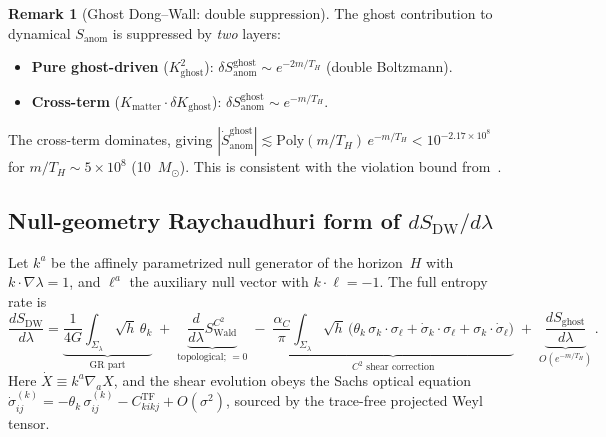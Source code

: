 \documentclass[11pt,a4paper]{article}
\theoremstyle{plain}
\theoremstyle{definition}
\newtheorem{remark}[theorem]{Remark}
\begin{document}
\begin{remark}[Ghost Dong--Wall: double suppression]
  The ghost contribution to dynamical $S_{\mathrm{anom}}$ is
  suppressed by \emph{two} layers:
  \begin{itemize}
    \item \textbf{Pure ghost-driven} ($K_{\mathrm{ghost}}^2$):
      $\delta S_{\mathrm{anom}}^{\mathrm{ghost}} \sim e^{-2m/T_H}$
      (double Boltzmann).
    \item \textbf{Cross-term}
      ($K_{\mathrm{matter}} \cdot \delta K_{\mathrm{ghost}}$):
      $\delta S_{\mathrm{anom}}^{\mathrm{ghost}} \sim e^{-m/T_H}$.
  \end{itemize}
  The cross-term dominates, giving
  $|\dot{S}_{\mathrm{anom}}^{\mathrm{ghost}}|
  \lesssim \mathrm{Poly}(m/T_H)\,e^{-m/T_H}
  < 10^{-2.17 \times 10^8}$ for $m/T_H \sim 5 \times 10^8$
  (10~$M_\odot$).  This is consistent with the violation bound
  from~.
\end{remark}

\subsection{Null-geometry Raychaudhuri form of $dS_{\mathrm{DW}}/d\lambda$}

Let $k^a$ be the affinely parametrized null generator of the horizon~$H$
with $k \cdot \nabla\lambda = 1$, and $\ell^a$ the auxiliary null vector
with $k \cdot \ell = -1$.  The full entropy rate is
\begin{equation}\label{eq:dSdw_full}
  \boxed{
  \frac{dS_{\mathrm{DW}}}{d\lambda}
  = \underbrace{\frac{1}{4G}\int_{\Sigma_\lambda}\!\sqrt{h}\,
    \theta_k}_{\text{GR part}}
  \;+\; \underbrace{\frac{d}{d\lambda}
    S_{\mathrm{Wald}}^{C^2}}_{\text{topological; $=0$}}
  \;-\; \underbrace{\frac{\alpha_C}{\pi}
    \int_{\Sigma_\lambda}\!\sqrt{h}\,
    \bigl(\theta_k\,\sigma_k{\cdot}\sigma_\ell
    + \dot\sigma_k{\cdot}\sigma_\ell
    + \sigma_k{\cdot}\dot\sigma_\ell\bigr)
    }_{\text{$C^2$ shear correction}}
  \;+\; \underbrace{\frac{dS_{\mathrm{ghost}}}{d\lambda}
    }_{O(e^{-m/T_H})}\,.
  }
\end{equation}
Here $\dot{X} \equiv k^a\nabla_a X$, and the shear evolution obeys the
Sachs optical equation
$\dot\sigma^{(k)}_{ij} = -\theta_k\,\sigma^{(k)}_{ij}
- C_{kikj}^{\mathrm{TF}} + O(\sigma^2)$,
sourced by the trace-free projected Weyl tensor.
\end{document}
